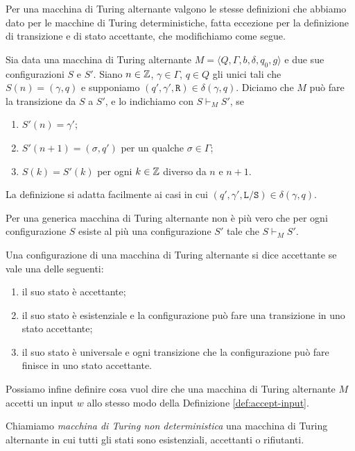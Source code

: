 Per una macchina di Turing alternante valgono le stesse definizioni che
abbiamo dato per le macchine di Turing deterministiche, 
fatta eccezione per la definizione di transizione e di stato accettante, che
modifichiamo come segue.
\begin{definizione}
 Sia data una macchina di Turing alternante $M=\langle Q, \Gamma, b, \delta, q_0, g \rangle$
 e due sue configurazioni $S$ e $S'$.
 Siano $n \in \mathbb{Z}$, $\gamma \in \Gamma$, $q \in Q$ gli unici tali che
 $S(n) = (\gamma, q)$ e supponiamo $(q', \gamma', \texttt{R}) \in \delta(\gamma, q)$.
 Diciamo che  $M$ può fare la transizione da $S$ a $S'$, e lo indichiamo con
 $S \vdash_M S'$, se 
 \begin{enumerate}
  \item $S'(n)=\gamma'$;
  \item $S'(n+1)=(\sigma, q')$ per un
 qualche $\sigma \in \Gamma$;
  \item $S(k) = S'(k)$ per ogni $k \in \mathbb{Z}$ diverso da
 $n$ e $n+1$.
 \end{enumerate}
 La definizione si adatta facilmente ai casi in cui
 $(q', \gamma', \texttt{L}/\texttt{S}) \in \delta(\gamma, q)$.
\end{definizione}

\begin{osservazione}
 Per una generica macchina di Turing alternante non è più vero che per ogni
 configurazione $S$ esiste al più una configurazione $S'$ tale che $S \vdash_M S'$.
\end{osservazione}

\begin{definizione}
 Una configurazione di una macchina di Turing alternante si dice accettante se
 vale una delle seguenti:
 \begin{enumerate}
  \item il suo stato è accettante;
  \item il suo stato è esistenziale e la configurazione può fare una transizione
  in uno stato accettante;
  \item il suo stato è universale e ogni transizione che la configurazione può fare
  finisce in uno stato accettante.
 \end{enumerate}
\end{definizione}
Possiamo infine definire cosa vuol dire che una macchina di Turing alternante
$M$ accetti un input $w$ allo stesso modo della Definizione \ref{def:accept-input}.

\begin{definizione}
 Chiamiamo \emph{macchina di Turing non deterministica} una macchina di Turing
 alternante in cui tutti gli stati sono esistenziali, accettanti o rifiutanti.
\end{definizione}

